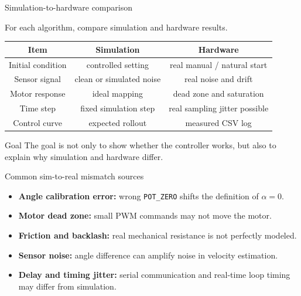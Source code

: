 \documentclass[aspectratio=169]{beamer}
\begin{document}
\begin{frame}{Simulation-to-hardware comparison}

For each algorithm, compare simulation and hardware results.

\vspace{0.2cm}

\begin{center}
\begin{tabular}{c|c|c}
\hline
\textbf{Item} & \textbf{Simulation} & \textbf{Hardware} \\
\hline
Initial condition & controlled setting & real manual / natural start \\
\hline
Sensor signal & clean or simulated noise & real noise and drift \\
\hline
Motor response & ideal mapping & dead zone and saturation \\
\hline
Time step & fixed simulation step & real sampling jitter possible \\
\hline
Control curve & expected rollout & measured CSV log \\
\hline
\end{tabular}
\end{center}

\vspace{0.15cm}

\begin{block}{Goal}
\small
The goal is not only to show whether the controller works, but also to explain why simulation and hardware differ.
\end{block}

\end{frame}





\begin{frame}{Common sim-to-real mismatch sources}

\begin{itemize}
    \item \textbf{Angle calibration error:}
    wrong \texttt{POT\_ZERO} shifts the definition of \(\alpha=0\).
    \vspace{0.18cm}

    \item \textbf{Motor dead zone:}
    small PWM commands may not move the motor.
    \vspace{0.18cm}

    \item \textbf{Friction and backlash:}
    real mechanical resistance is not perfectly modeled.
    \vspace{0.18cm}

    \item \textbf{Sensor noise:}
    angle difference can amplify noise in velocity estimation.
    \vspace{0.18cm}

    \item \textbf{Delay and timing jitter:}
    serial communication and real-time loop timing may differ from simulation.
\end{itemize}

\end{frame}
\end{document}
